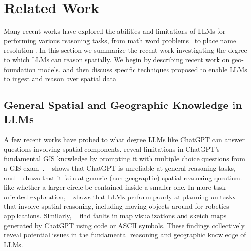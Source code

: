 \section{Related Work}
\label{section:related}
\normalsize

Many recent works have explored the abilities and limitations of LLMs for performing various reasoning tasks, from math word problems~\cite{Gao2023, Badaro2023} to place name resolution \cite{Mai2023}.
In this section we summarize the recent work investigating the degree to which LLMs can reason spatially.
We begin by describing recent work on geo-foundation models, and then discuss specific techniques proposed to enable LLMs to ingest and reason over spatial data.


\subsection{General Spatial and Geographic Knowledge in LLMs}
A few recent works have probed to what degree LLMs like ChatGPT can answer questions involving spatial components.
%
\citeauthor{Mooney2023} reveal limitations in ChatGPT's fundamental GIS knowledge by prompting it with multiple choice questions from a GIS exam~\cite{Mooney2023}.
\citeauthor{Bang2023}~\cite{Bang2023} shows that ChatGPT is unreliable at general reasoning tasks, and
\citeauthor{Cohn2023}~\cite{Cohn2023} shows that it fails at generic (non-geographic) spatial reasoning questions like whether a larger circle be contained inside a smaller one.
In more task-oriented exploration, 
\citeauthor{Xie2023}~\cite{Xie2023} shows that LLMs perform poorly at planning on tasks that involve spatial reasoning, including moving objects around for robotics applications.
Similarly, 
\citeauthor{Tao2023}~\cite{Tao2023} find faults in map visualizations and sketch maps generated by ChatGPT using code or ASCII symbols.
%
These findings collectively reveal potential issues in the fundamental reasoning and geographic knowledge of LLMs.





